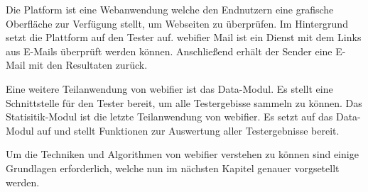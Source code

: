 Die Platform ist eine Webanwendung welche den Endnutzern eine grafische Oberfläche zur Verfügung stellt, um Webseiten zu überprüfen. Im Hintergrund setzt die Plattform auf den Tester auf. webifier Mail ist ein Dienst mit dem Links aus E-Mails überprüft werden können. Anschließend erhält der Sender eine E-Mail mit den Resultaten zurück.

Eine weitere Teilanwendung von webifier ist das Data-Modul. Es stellt eine Schnittstelle für den Tester bereit, um alle Testergebisse sammeln zu können. Das Statisitik-Modul ist die letzte Teilanwendung von webifier. Es setzt auf das Data-Modul auf und stellt Funktionen zur Auswertung aller Testergebnisse bereit.

Um die Techniken und Algorithmen von webifier verstehen zu können sind einige Grundlagen erforderlich, welche nun im nächsten Kapitel genauer vorgsetellt werden.
